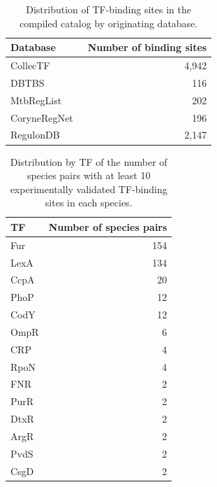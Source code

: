 \begin{table}
\caption{Distribution of TF-binding sites in the compiled catalog by
originating database.}
\label{tab:database-numbers}
\centering
\begin{tabular}{l r}
\toprule
Database & Number of binding sites \\
\midrule
CollecTF~\cite{kilic2013collectf} & 4,942 \\
DBTBS~\cite{sierro2008dbtbs} & 116 \\
MtbRegList~\cite{jacques2005mtbreglist} & 202 \\
CoryneRegNet~\cite{pauling2012coryneregnet} & 196 \\
RegulonDB~\cite{salgado2013regulondb} & 2,147 \\
\bottomrule
\end{tabular}
\end{table}

\begin{table}
\centering
\caption{Distribution by TF of the number of species pairs with at least 10
  experimentally validated TF-binding sites in each species.}
\label{tab:number-of-species-pairs}

\begin{tabular}{l r}
\toprule
TF & Number of species pairs \\
\midrule
  Fur & 154 \\
  LexA & 134 \\
  CcpA & 20 \\
  PhoP & 12 \\
  CodY & 12 \\
  OmpR & 6 \\
  CRP & 4 \\
  RpoN & 4 \\
  FNR & 2 \\
  PurR & 2 \\
  DtxR & 2 \\
  ArgR & 2 \\
  PvdS & 2 \\
  CsgD & 2 \\
\bottomrule
\end{tabular}
\end{table}

